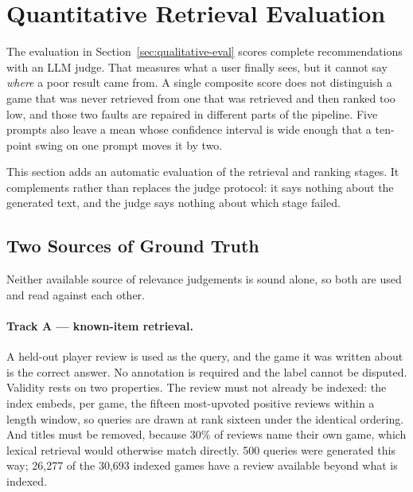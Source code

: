 %

\section{Quantitative Retrieval Evaluation}
\label{sec:retrieval-eval}

The evaluation in Section~\ref{sec:qualitative-eval} scores complete
recommendations with an LLM judge. That measures what a user finally sees, but
it cannot say \emph{where} a poor result came from. A single composite score
does not distinguish a game that was never retrieved from one that was
retrieved and then ranked too low, and those two faults are repaired in
different parts of the pipeline. Five prompts also leave a mean whose
confidence interval is wide enough that a ten-point swing on one prompt moves
it by two.

This section adds an automatic evaluation of the retrieval and ranking stages.
It complements rather than replaces the judge protocol: it says nothing about
the generated text, and the judge says nothing about which stage failed.

\subsection{Two Sources of Ground Truth}
\label{sec:eval-tracks}

Neither available source of relevance judgements is sound alone, so both are
used and read against each other.

\paragraph{Track A --- known-item retrieval.}
A held-out player review is used as the query, and the game it was written
about is the correct answer. No annotation is required and the label cannot be
disputed. Validity rests on two properties. The review must not already be
indexed: the index embeds, per game, the fifteen most-upvoted positive reviews
within a length window, so queries are drawn at rank sixteen under the
identical ordering. And titles must be removed, because 30\% of reviews name
their own game, which lexical retrieval would otherwise match directly. 500
queries were generated this way; 26,277 of the 30,693 indexed games have a
review available beyond what is indexed.

